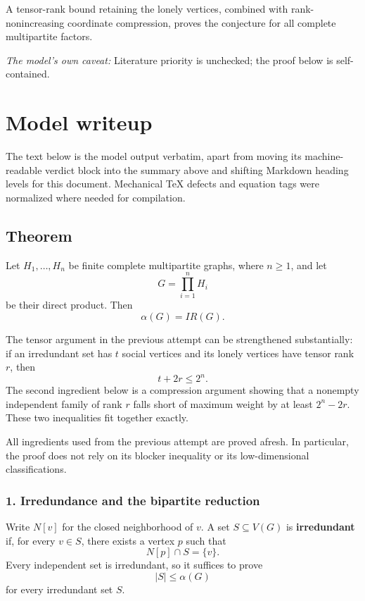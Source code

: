 \documentclass[
  11pt,
  a4paper,
]{article}
\newcounter{none} %
\begin{document}
A tensor-rank bound retaining the lonely vertices, combined with
rank-nonincreasing coordinate compression, proves the conjecture for all
complete multipartite factors.

\emph{The model's own caveat:} Literature priority is unchecked; the
proof below is self-contained.

\section{Model writeup}\label{model-writeup}

The text below is the model output verbatim, apart from moving its
machine-readable verdict block into the summary above and shifting
Markdown heading levels for this document. Mechanical TeX defects and
equation tags were normalized where needed for compilation.

\subsection{Theorem}\label{theorem}

Let \(H_1,\ldots,H_n\) be finite complete multipartite graphs, where
\(n\ge 1\), and let \[
G=\prod_{i=1}^{n}H_i
\] be their direct product. Then \[
\boxed{\alpha(G)=IR(G).}
\]

The tensor argument in the previous attempt can be strengthened
substantially: if an irredundant set has \(t\) social vertices and its
lonely vertices have tensor rank \(r\), then \[
t+2r\le 2^n.
\] The second ingredient below is a compression argument showing that a
nonempty independent family of rank \(r\) falls short of maximum weight
by at least \(2^n-2r\). These two inequalities fit together exactly.

All ingredients used from the previous attempt are proved afresh. In
particular, the proof does not rely on its blocker inequality or its
low-dimensional classifications.

\subsubsection{1. Irredundance and the bipartite
reduction}\label{irredundance-and-the-bipartite-reduction}

Write \(N[v]\) for the closed neighborhood of \(v\). A set
\(S\subseteq V(G)\) is \textbf{irredundant} if, for every \(v\in S\),
there exists a vertex \(p\) such that \[
N[p]\cap S=\{v\}.
\] Every independent set is irredundant, so it suffices to prove \[
|S|\le \alpha(G)
\] for every irredundant set \(S\).
\end{document}

